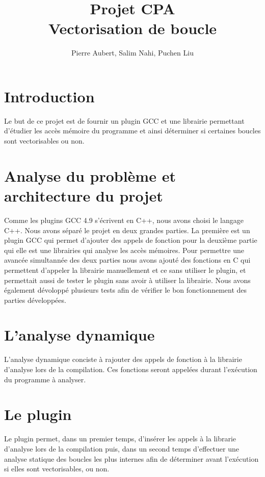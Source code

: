 \documentclass[12pt,french]{article}
\title{\color{blue}Projet CPA \\ Vectorisation de boucle}
\author{Pierre Aubert, Salim Nahi, Puchen Liu}
\begin{document}
\maketitle



\section*{\color{blue}Introduction}

Le but de ce projet est de fournir un plugin GCC et une librairie permettant d'étudier les accès mémoire du programme et ainsi déterminer si certaines boucles sont vectorisables ou non.

\tableofcontents

\section{\color{blue}Analyse du problème et architecture du projet}

Comme les plugins GCC 4.9 s'écrivent en C++, nous avons choisi le langage C++. Nous avons séparé le projet en deux grandes parties. La première est un plugin GCC qui permet d'ajouter des appels de fonction pour la deuxième partie qui elle est une librairies qui analyse les accès mémoires. Pour permettre une avancée simultannée des deux parties nous avons ajouté des fonctions en C qui permettent d'appeler la librairie manuellement et ce sans utiliser le plugin, et permettait aussi de tester le plugin sans avoir à utiliser la librairie. Nous avons également dévoloppé plusieurs tests afin de vérifier le bon fonctionnement des parties développées.

\section{\color{blue}L'analyse dynamique}

L'analyse dynamique conciste à rajouter des appels de fonction à la librairie d'analyse lors de la compilation. Ces fonctions seront appelées durant l'exécution du programme à analyser. 


\section{\color{blue}Le plugin}

Le plugin permet, dans un premier temps, d'insérer les appels à la librarie d'analyse lors de la compilation puis, dans un second temps d'effectuer une analyse statique des boucles les plus internes afin de déterminer avant l'exécution si elles sont vectorisables, ou non.
\end{document}
